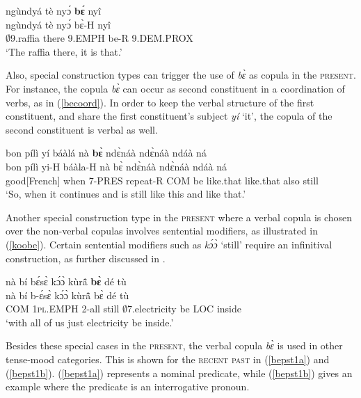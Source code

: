 \begin{exe} 
\ex\label{beEMPH2}
  \glll   ngùndyá tè nyɔ́ {\bfseries bɛ́} nyî \\
          ngùndyá tè nyɔ́ bɛ̀-H nyî \\
           $\emptyset$9.raffia there 9.EMPH be-R 9.DEM.PROX  \\
    \trans `The raffia there, it is that.'
\end{exe}

Also, special construction types can trigger the use of {\itshape bɛ̀} as copula in the \textsc{present}. For instance, the copula {\itshape bɛ̀} can occur as second constituent in a coordination of verbs, as in (\ref{becoord}). In order to keep the verbal structure of the first constituent, and share the first constituent's subject {\itshape yí} `it', the copula of the second constituent is verbal as well.

\begin{exe} 
\ex\label{becoord}
  \glll  bon pílì yí báàlá nà {\bfseries bɛ̀} ndɛ̀náà ndɛ̀náà ndáà ná\\
        bon pílì yi-H báàla-H nà bɛ̀ ndɛ̀náà ndɛ̀náà ndáà ná \\
          good[French] when 7-PRES repeat-R COM be like.that like.that also still  \\
    \trans `So, when it continues and is still like this and like that.'
\end{exe}

Another special construction type in the \textsc{present} where a verbal copula is chosen over the non-verbal copulas involves sentential modifiers, as illustrated in (\ref{koobe}). Certain sentential modifiers such as {\itshape kɔ́ɔ̀} `still' require an infinitival construction, as further discussed in .

\begin{exe} 
\ex\label{koobe}
  \glll nà bí bɛ́sɛ̀ kɔ́ɔ̀ kùrã̂ {\bfseries bɛ̀} dé tù \\
       nà bí b-ɛ́sɛ̀ kɔ́ɔ̀ kùrã̂ bɛ̀ dé tù \\
        COM 1\textsc{pl}.EMPH 2-all still $\emptyset$7.electricity  be LOC inside \\
    \trans `with all of us just electricity be inside.'
\end{exe}

Besides these special cases in the \textsc{present}, the verbal copula {\itshape bɛ̀} is used in other tense-mood categories. This is shown for the \textsc{recent past} in (\ref{bepst1a}) and (\ref{bepst1b}). (\ref{bepst1a}) represents a nominal predicate, while (\ref{bepst1b}) gives an example where the predicate is an interrogative pronoun.


